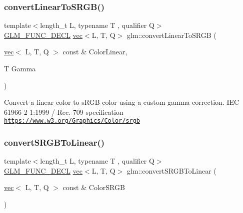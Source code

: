 \subsubsection{\texorpdfstring{convert\+Linear\+To\+S\+R\+G\+B()}{convertLinearToSRGB()}\hspace{0.1cm}{\footnotesize\ttfamily [2/2]}}
{\footnotesize\ttfamily template$<$length\+\_\+t L, typename T , qualifier Q$>$ \\
\mbox{\hyperlink{setup_8hpp_ab2d052de21a70539923e9bcbf6e83a51}{G\+L\+M\+\_\+\+F\+U\+N\+C\+\_\+\+D\+E\+CL}} \mbox{\hyperlink{structglm_1_1vec}{vec}}$<$L, T, Q$>$ glm\+::convert\+Linear\+To\+S\+R\+GB (\begin{DoxyParamCaption}\item[{\mbox{\hyperlink{structglm_1_1vec}{vec}}$<$ L, T, Q $>$ const \&}]{Color\+Linear,  }\item[{T}]{Gamma }\end{DoxyParamCaption})}

Convert a linear color to s\+R\+GB color using a custom gamma correction. I\+EC 61966-\/2-\/1\+:1999 / Rec. 709 specification \href{https://www.w3.org/Graphics/Color/srgb}{\tt https\+://www.\+w3.\+org/\+Graphics/\+Color/srgb} \mbox{\label{group__gtc__color__space_ga16c798b7a226b2c3079dedc55083d187}} 
\subsubsection{\texorpdfstring{convert\+S\+R\+G\+B\+To\+Linear()}{convertSRGBToLinear()}\hspace{0.1cm}{\footnotesize\ttfamily [1/2]}}
{\footnotesize\ttfamily template$<$length\+\_\+t L, typename T , qualifier Q$>$ \\
\mbox{\hyperlink{setup_8hpp_ab2d052de21a70539923e9bcbf6e83a51}{G\+L\+M\+\_\+\+F\+U\+N\+C\+\_\+\+D\+E\+CL}} \mbox{\hyperlink{structglm_1_1vec}{vec}}$<$L, T, Q$>$ glm\+::convert\+S\+R\+G\+B\+To\+Linear (\begin{DoxyParamCaption}\item[{\mbox{\hyperlink{structglm_1_1vec}{vec}}$<$ L, T, Q $>$ const \&}]{Color\+S\+R\+GB }\end{DoxyParamCaption})}

